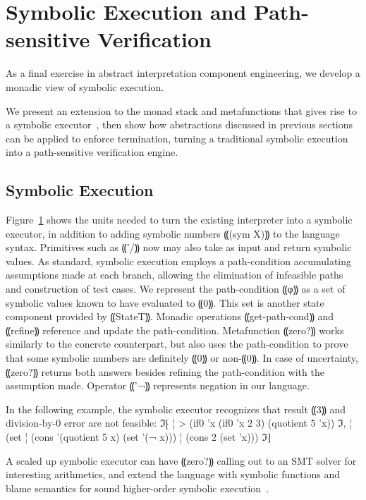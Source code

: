 \section{Symbolic Execution and Path-sensitive Verification}\label{s:symbolic}

As a final exercise in abstract interpretation component engineering, we
develop a monadic view of symbolic execution.

We present an extension to the monad stack and metafunctions that gives rise to
a symbolic executor~\cite{dvanhorn:King1976Symbolic}, then show how
abstractions discussed in previous sections can be applied to enforce
termination, turning a traditional symbolic execution into a path-sensitive
verification engine.

\subsection{Symbolic Execution}
Figure~\ref{s:symbolic} shows the units needed to turn the existing interpreter
into a symbolic executor, in addition to adding symbolic numbers ⸨(sym X)⸩
to the language syntax.
Primitives such as ⸨'/⸩ now may also take as input
and return symbolic values.
As standard, symbolic execution employs a path-condition
accumulating assumptions made at each branch,
allowing the elimination of infeasible paths and construction of test cases.
We represent the path-condition ⸨φ⸩ as a set of symbolic values
known to have evaluated to ⸨0⸩.
This set is another state component provided by ⸨StateT⸩.
Monadic operations ⸨get-path-cond⸩
and ⸨refine⸩ reference and update the path-condition.
Metafunction ⸨zero?⸩ works similarly to the concrete counterpart,
but also uses the path-condition to prove that some symbolic numbers
are definitely ⸨0⸩ or non-⸨0⸩.
In case of uncertainty, ⸨zero?⸩ returns both answers
besides refining the path-condition with the assumption made.
Operator ⸨'¬⸩ represents negation in our language.

In the following example, the symbolic executor recognizes that
result ⸨3⸩ and division-by-0 error are not feasible:
ℑ⁅
¦ > (if0 'x (if0 'x 2 3) (quotient 5 'x))
ℑ,
¦ (set
¦    (cons '(quotient 5 x) (set '(¬ x)))
¦    (cons 2 (set 'x)))
ℑ⁆

A scaled up symbolic executor can have ⸨zero?⸩ calling out
to an SMT solver for interesting arithmetics,
and extend the language with symbolic functions
and blame semantics for sound higher-order symbolic
execution~\cite{dvanhorn:TobinHochstadt2012Higherorder,dvanhorn:Nguyen2015Relatively}.

